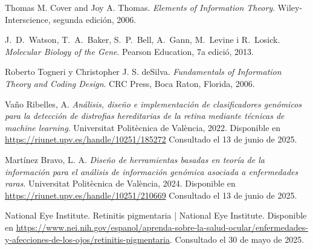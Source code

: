 \documentclass[11pt,spanish,listoffigures,listoftables]{tfgetsinf}
\begin{document}
\begin{thebibliography}{99}



   

   Thomas M. Cover and Joy A. Thomas.  
   \newblock \textit{Elements of Information Theory}.  
   \newblock Wiley-Interscience, segunda edición, 2006.

   J.~D.~Watson, T.~A.~Baker, S.~P.~Bell, A.~Gann, M.~Levine i R.~Losick.
   \newblock \textit{Molecular Biology of the Gene}.
   \newblock Pearson Education, 7a edició, 2013.
   
   Roberto Togneri y Christopher J. S. deSilva.  
   \newblock \textit{Fundamentals of Information Theory and Coding Design}.  
   \newblock CRC Press, Boca Raton, Florida, 2006.


   Vaño Ribelles, A.  
   \newblock \textit{Análisis, diseño e implementación de clasificadores genómicos para la detección de distrofias hereditarias de la retina mediante técnicas de machine learning}.  
   \newblock Universitat Politècnica de València, 2022.  
   \newblock Disponible en  
   \url{https://riunet.upv.es/handle/10251/185272}
   \newblock Consultado el 13 de junio de 2025.

   Martínez Bravo, L. A.  
   \newblock \textit{Diseño de herramientas basadas en teoría de la información para el análisis de información genómica asociada a enfermedades raras}.  
   \newblock Universitat Politècnica de València, 2024.  
   \newblock Disponible en  
   \url{https://riunet.upv.es/handle/10251/210669}
   \newblock Consultado el 13 de junio de 2025.


   National Eye Institute.  
   \newblock Retinitis pigmentaria | National Eye Institute.  
   \newblock Disponible en  
   \url{https://www.nei.nih.gov/espanol/aprenda-sobre-la-salud-ocular/enfermedades-y-afecciones-de-los-ojos/retinitis-pigmentaria}.
   \newblock Consultado el 30 de mayo de 2025.


\end{thebibliography}
\end{document}

